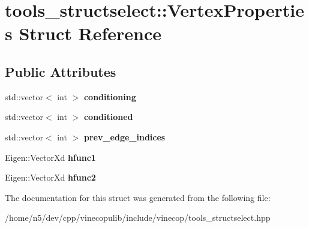 \hypertarget{structtools__structselect_1_1_vertex_properties}{}\section{tools\+\_\+structselect\+:\+:Vertex\+Properties Struct Reference}
\label{structtools__structselect_1_1_vertex_properties}
\subsection*{Public Attributes}
\begin{DoxyCompactItemize}
\item 
std\+::vector$<$ int $>$ {\bfseries conditioning}\hypertarget{structtools__structselect_1_1_vertex_properties_a7e500dc94ac0aed424c05264f7566487}{}\label{structtools__structselect_1_1_vertex_properties_a7e500dc94ac0aed424c05264f7566487}

\item 
std\+::vector$<$ int $>$ {\bfseries conditioned}\hypertarget{structtools__structselect_1_1_vertex_properties_ac23ba72092e9fb5e6701b0915c3ce3c2}{}\label{structtools__structselect_1_1_vertex_properties_ac23ba72092e9fb5e6701b0915c3ce3c2}

\item 
std\+::vector$<$ int $>$ {\bfseries prev\+\_\+edge\+\_\+indices}\hypertarget{structtools__structselect_1_1_vertex_properties_a778a08214795c92af7e9b964f3503c32}{}\label{structtools__structselect_1_1_vertex_properties_a778a08214795c92af7e9b964f3503c32}

\item 
Eigen\+::\+Vector\+Xd {\bfseries hfunc1}\hypertarget{structtools__structselect_1_1_vertex_properties_aadb76eaec05681f0fc6bbdcdcb987dd4}{}\label{structtools__structselect_1_1_vertex_properties_aadb76eaec05681f0fc6bbdcdcb987dd4}

\item 
Eigen\+::\+Vector\+Xd {\bfseries hfunc2}\hypertarget{structtools__structselect_1_1_vertex_properties_a4ef1da3acc6eb6c7262b4133a1a78fb6}{}\label{structtools__structselect_1_1_vertex_properties_a4ef1da3acc6eb6c7262b4133a1a78fb6}

\end{DoxyCompactItemize}


The documentation for this struct was generated from the following file\+:\begin{DoxyCompactItemize}
\item 
/home/n5/dev/cpp/vinecopulib/include/vinecop/tools\+\_\+structselect.\+hpp\end{DoxyCompactItemize}
